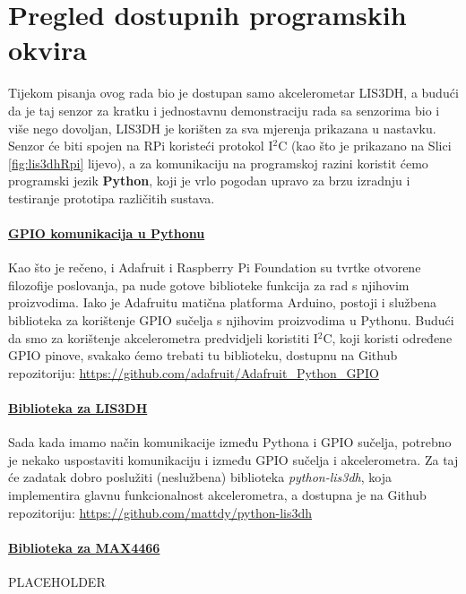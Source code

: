 \documentclass[12pt,a4paper]{article}
\begin{document}
\section{Pregled dostupnih programskih okvira}
Tijekom pisanja ovog rada bio je dostupan samo akcelerometar LIS3DH, a budući da je taj senzor za kratku i jednostavnu demonstraciju rada sa senzorima bio i više nego dovoljan, LIS3DH je korišten za sva mjerenja prikazana u nastavku. Senzor će biti spojen na RPi koristeći protokol I$^2$C (kao što je prikazano na Slici \ref{fig:lis3dhRpi} lijevo), a za komunikaciju na programskoj razini koristit ćemo programski jezik \textbf{Python}, koji je vrlo pogodan upravo za brzu izradnju i testiranje prototipa različitih sustava.

\paragraph{\underline{GPIO komunikacija u Pythonu}} %
	\label{par:gpio_py}
		Kao što je rečeno, i Adafruit i Raspberry Pi Foundation su tvrtke otvorene filozofije poslovanja, pa nude gotove biblioteke funkcija za rad s njihovim proizvodima. Iako je Adafruitu matična platforma Arduino, postoji i službena biblioteka za korištenje GPIO sučelja s njihovim proizvodima u Pythonu. Budući da smo za korištenje akcelerometra predvidjeli koristiti I$^2$C, koji koristi određene GPIO pinove, svakako ćemo trebati tu biblioteku, dostupnu na Github repozitoriju: \url{https://github.com/adafruit/Adafruit_Python_GPIO}
		

\paragraph{\underline{Biblioteka za LIS3DH}} %
	\label{par:lis3dh_lib}
		Sada kada imamo način komunikacije između Pythona i GPIO sučelja, potrebno je nekako uspostaviti komunikaciju i između GPIO sučelja i akcelerometra. Za taj će zadatak dobro poslužiti (neslužbena) biblioteka \textit{python-lis3dh}, koja implementira glavnu funkcionalnost akcelerometra, a dostupna je na Github repozitoriju: \url{https://github.com/mattdy/python-lis3dh}


\paragraph{\underline{Biblioteka za MAX4466}} %
	\label{par:max4466_lib}
		PLACEHOLDER
\end{document}
